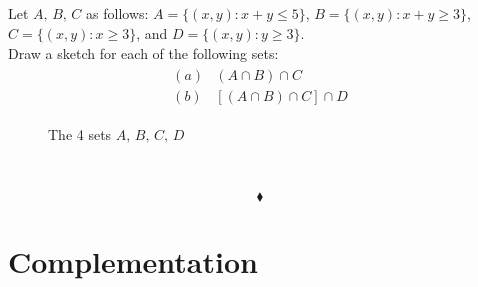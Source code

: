 \subsection{}
\begin{tcolorbox}
Let $A,\, B,\,C$ as follows: $A=\{(x,y):x+y\le 5\}$, $ B=\{(x,y):x+y\ge 3\}$, $C=\{(x,y):x\ge 3\}$, and $D=\{(x,y):y\ge 3\}$.\\Draw a sketch for each of the following sets:
\begin{align*}
\begin{array}{ll}
(a)&(A\cap B)\cap C\\
(b)&[(A\cap B)\cap C]\cap D
\end{array}
\end{align*}
\end{tcolorbox}
\begin{figure}[H]%
    \centering
    
\caption{The 4 sets $A,\,B,\, C,\, D$}
\label{fig:fig_p8b}
\end{figure}
\begin{figure}[H]%
    \centering
    \subfloat[$( (A\cap B)\cap C)\cap D =\emptyset$]{}\\
\label{fig:fig_p8b}
\end{figure}
$$\blacklozenge$$
\section{Complementation}
